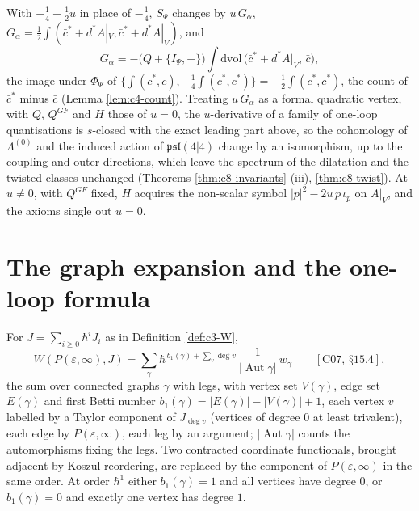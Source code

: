 \begin{remark}
\label{rem:c3-nielsen}
With $-\tfrac14+\tfrac12u$ in place of $-\tfrac14$, $S_\Psi$ changes by $u\,G_\alpha$, $G_\alpha=\tfrac12\int(\bar c^*+d^*A|_V,\bar c^*+d^*A|_V)$, and
\[
G_\alpha=-\big(Q+\{I_\Psi,-\}\big)\int\mathrm{dvol}\,\big(\bar c^*+d^*A|_V,\,\bar c\big),
\]
the image under $\Phi_\Psi$ of $\{\int(\bar c^*,\bar c),-\tfrac14\int(\bar c^*,\bar c^*)\}=-\tfrac12\int(\bar c^*,\bar c^*)$, the count of $\bar c^*$ minus $\bar c$ (Lemma \ref{lem:c4-count}). Treating $u\,G_\alpha$ as a formal quadratic vertex, with $Q$, $Q^{GF}$ and $H$ those of $u=0$, the $u$-derivative of a family of one-loop quantisations is $s$-closed with the exact leading part above, so the cohomology of $\Lambda^{(0)}$ and the induced action of $\mathfrak{psl}(4|4)$ change by an isomorphism, up to the coupling and outer directions, which leave the spectrum of the dilatation and the twisted classes unchanged (Theorems \ref{thm:c8-invariants} (iii), \ref{thm:c8-twist}). At $u\neq0$, with $Q^{GF}$ fixed, $H$ acquires the non-scalar symbol $|p|^2-2u\,p\,\iota_p$ on $A|_V$, and the axioms single out $u=0$.
\end{remark}

\section{The graph expansion and the one-loop formula}

\begin{proposition}
\label{prop:c3-graphs}
For $J=\sum_{i\ge0}\hbar^iJ_i$ as in Definition \ref{def:c3-W},
\[
W(P(\varepsilon,\infty),J)=\sum_\gamma\hbar^{\,b_1(\gamma)+\sum_v\deg v}\,\frac{1}{|\operatorname{Aut}\gamma|}\,w_\gamma\qquad[\text{C07, §15.4}],
\]
the sum over connected graphs $\gamma$ with legs, with vertex set $V(\gamma)$, edge set $E(\gamma)$ and first Betti number $b_1(\gamma)=|E(\gamma)|-|V(\gamma)|+1$, each vertex $v$ labelled by a Taylor component of $J_{\deg v}$ (vertices of degree $0$ at least trivalent), each edge by $P(\varepsilon,\infty)$, each leg by an argument; $|\operatorname{Aut}\gamma|$ counts the automorphisms fixing the legs. Two contracted coordinate functionals, brought adjacent by Koszul reordering, are replaced by the component of $P(\varepsilon,\infty)$ in the same order. At order $\hbar^1$ either $b_1(\gamma)=1$ and all vertices have degree $0$, or $b_1(\gamma)=0$ and exactly one vertex has degree $1$.
\end{proposition}

